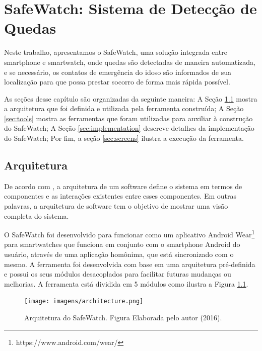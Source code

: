 \chapter{SafeWatch: Sistema de Detecção de Quedas}
\label{cap:safeWatch}

Neste trabalho, apresentamos o SafeWatch, uma solução integrada entre smartphone e smartwatch, onde quedas são detectadas de maneira automatizada, e se necessário, os contatos de emergência do idoso são informados de sua localização para que possa prestar socorro de forma mais rápida possível. 


As seções desse capítulo são organizadas da seguinte maneira: A Seção \ref{sec:architecture} mostra a arquitetura que foi definida e utilizada pela ferramenta construída; A Seção \ref{sec:tools} mostra as ferramentas que foram utilizadas para auxiliar à construção do SafeWatch; A Seção \ref{sec:implementation} descreve detalhes da implementação do SafeWatch; Por fim, a seção \ref{sec:screens} ilustra a execução da ferramenta.



\section{Arquitetura}
\label{sec:architecture}

De acordo com \cite{garlan1993introduction}, a arquitetura de um software define o sistema em termos de componentes e as interações existentes entre esses componentes. Em outras palavras, a arquitetura de software tem o objetivo de mostrar uma visão completa do sistema. 

O SafeWatch foi desenvolvido para funcionar como um aplicativo Android Wear\footnote{https://www.android.com/wear/} para smartwatches que funciona em conjunto com o smartphone Android do usuário, através de uma aplicação homônima, que está sincronizado com o mesmo. A ferramenta foi desenvolvida com base em uma arquitetura pré-definida e possui os seus módulos desacoplados para facilitar futuras mudanças ou melhorias. A ferramenta está dividida em 5 módulos como ilustra a Figura \ref{fig:architecture}.

\begin{figure}[ht]
	\centering
	\texttt{[image: imagens/architecture.png]}
	\caption{ Arquitetura do SafeWatch. Figura Elaborada pelo autor (2016).}
	\label{fig:architecture}
\end{figure} 



